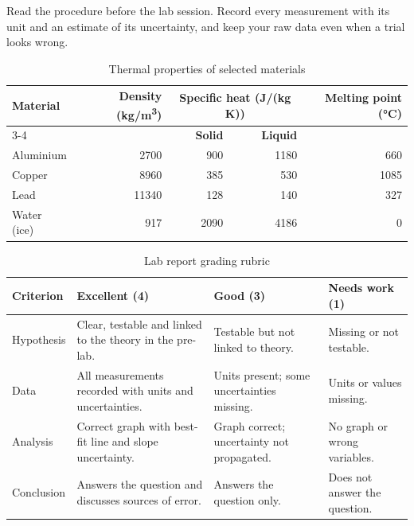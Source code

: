 \documentclass[11pt]{article}
\begin{document}
Read the procedure before the lab session. Record every measurement with its unit and an estimate of its uncertainty, and keep your raw data even when a trial looks wrong. 
\begin{table}[H]\centering
\caption{Thermal properties of selected materials}
\begin{tabular}{lrrrr}
\toprule
\multirow{2}{*}{\textbf{Material}} & \multirow{2}{*}{\textbf{Density (kg/m\textsuperscript{3})}} & \multicolumn{2}{c}{\textbf{Specific heat (J/(kg K))}} & \multirow{2}{*}{\textbf{Melting point (°C)}} \\
\cmidrule(lr){3-4}
 & & \textbf{Solid} & \textbf{Liquid} & \\
\midrule
Aluminium & 2700 & 900 & 1180 & 660 \\
Copper & 8960 & 385 & 530 & 1085 \\
Lead & 11340 & 128 & 140 & 327 \\
Water (ice) & 917 & 2090 & 4186 & 0 \\
\bottomrule
\end{tabular}
\end{table}

\begin{table}[H]\centering
\caption{Lab report grading rubric}

\begin{tabularx}{\textwidth}{|l|X|X|X|}
\hline
\textbf{Criterion} & \textbf{Excellent (4)} & \textbf{Good (3)} & \textbf{Needs work (1)} \\
\hline
Hypothesis & Clear, testable and linked to the theory in the pre-lab. & Testable but not linked to theory. & Missing or not testable. \\ \hline
Data & All measurements recorded with units and uncertainties. & Units present; some uncertainties missing. & Units or values missing. \\ \hline
Analysis & Correct graph with best-fit line and slope uncertainty. & Graph correct; uncertainty not propagated. & No graph or wrong variables. \\ \hline
Conclusion & Answers the question and discusses sources of error. & Answers the question only. & Does not answer the question. \\ \hline
\end{tabularx}
\end{table}
\end{document}
